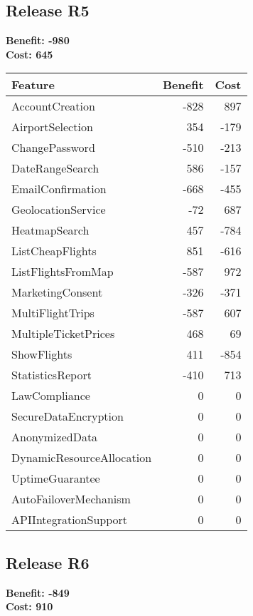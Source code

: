 \subsection{Release R5}
\textbf{Benefit: -980} \\
\textbf{Cost: 645} \\

\begin{tabular}{lrr}
\toprule
\textbf{Feature} & \textbf{Benefit} & \textbf{Cost} \\
\midrule
AccountCreation & -828 & 897 \\
AirportSelection & 354 & -179 \\
ChangePassword & -510 & -213 \\
DateRangeSearch & 586 & -157 \\
EmailConfirmation & -668 & -455 \\
GeolocationService & -72 & 687 \\
HeatmapSearch & 457 & -784 \\
ListCheapFlights & 851 & -616 \\
ListFlightsFromMap & -587 & 972 \\
MarketingConsent & -326 & -371 \\
MultiFlightTrips & -587 & 607 \\
MultipleTicketPrices & 468 & 69 \\
ShowFlights & 411 & -854 \\
StatisticsReport & -410 & 713 \\
LawCompliance & 0 & 0 \\
SecureDataEncryption & 0 & 0 \\
AnonymizedData & 0 & 0 \\
DynamicResourceAllocation & 0 & 0 \\
UptimeGuarantee & 0 & 0 \\
AutoFailoverMechanism & 0 & 0 \\
APIIntegrationSupport & 0 & 0 \\
\bottomrule
\end{tabular}

\subsection{Release R6}
\textbf{Benefit: -849} \\
\textbf{Cost: 910} \\

